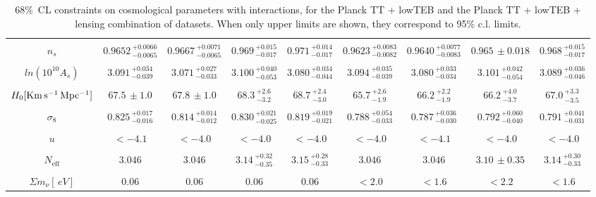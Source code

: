\documentclass[aps,prd,a4paper,twocolumn,amsmath,showpacs,superscriptaddress,nofootinbib,preprintnumbers]{revtex4-1}
\newcommand{\neff}{N_{\mathrm{eff}}}
\newcommand{\mnu}{{\Sigma}m_{\nu}}
\begin{document}
\begin{table*}
\begin{center}
{\begin{tabular}{c|cccccccc}
\hspace{1mm}\\
$n_s$ &  $0.9652\,^{+0.0066}_{-0.0065}$&$0.9667\,_{-0.0065}^{+0.0071}$  & $0.969\,^{+0.015}_{-0.017}$&$0.971\,_{-0.017}^{+0.014}$ &  $0.9623\,^{+0.0083}_{-0.0082}$& $0.9640\,_{-0.0083}^{+0.0077}$  & $0.965\,\pm 0.018 $&$0.968\,_{-0.017}^{+0.015}$  \\
\hspace{1mm}\\
$ln(10^{10}A_s)$ & $3.091\,^{+0.034}_{-0.039}$& $3.071\,^{+0.027}_{-0.033}$& $3.100\,_{-0.053}^{+0.040}$& $3.080\,_{-0.044}^{+0.034}$ & $3.094\,^{+0.035}_{-0.039}$& $3.080\,^{+0.033}_{-0.034}$& $3.101\,^{+0.042}_{-0.054}$& $3.089\,_{-0.046}^{+0.036}$\\
\hspace{1mm}\\
$H_0 [\rm{Km \, s^{-1} \, Mpc^{-1}}]$ &$67.5\,\pm 1.0$ &$67.8\,\pm 1.0 $&$68.3\,^{+2.6}_{-3.2}$ &$68.7\,_{-3.0}^{+2.4}$ &$65.7\,^{+2.6}_{-1.9}$ &$66.2\,^{+2.2}_{-1.9}$&$66.2\,^{+4.0}_{-3.7}$ &$67.0\,_{-3.5}^{+3.3}$  \\
\hspace{1mm}\\
$\sigma_8$ &$0.825\,_{-0.016}^{+0.017}$& $0.814\,_{-0.012}^{+0.014} $  & $0.830\,_{-0.025}^{+0.021}$& $0.819\,_{-0.021}^{+0.019}$ &$0.788\,_{-0.033}^{+0.054}$& $0.787\,^{+0.036}_{-0.030}$  & $0.792\,_{-0.040}^{+0.060}$& $0.791\,_{-0.031}^{+0.041}$ \\
\hspace{1mm}\\
$u$  & $<-4.1$&$<-4.0$&$<-4.0$&$<-4.0$&$<-4.0 $&$<-4.1$& $<-4.0$&$<-4.0$\\
\hspace{1mm}\\
$\neff$ &$3.046$ &$3.046$& $3.14\,_{-0.35}^{+0.32}$ &$3.15\,_{-0.33}^{+0.28}$&$3.046$ &$3.046$ & $3.10\,\pm 0.35$ &$3.14\,_{-0.33}^{+0.30}$ \\
\hspace{1mm}\\
$\mnu [ \, eV]$ &$0.06$&$0.06$&$0.06$&$0.06$&$<2.0$&$<1.6$&$<2.2$& $<1.6$\\
\hline
\end{tabular}}
\end{center}
\caption{$68\%$~CL constraints on cosmological parameters with interactions, for the Planck TT + lowTEB and the Planck TT + lowTEB + lensing combination of datasets. When only upper limits are shown, they correspond to 95\% c.l. limits.}
\label{tab:temp}
\end{table*}
\end{document}
